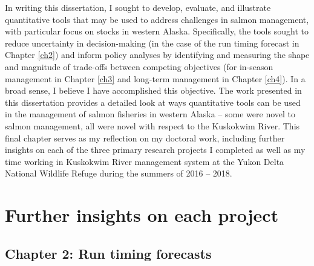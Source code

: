 \documentclass[12pt,]{book}
\theoremstyle{definition}
\theoremstyle{definition}
\theoremstyle{definition}
\theoremstyle{remark}
\begin{document}
\noindent
In writing this dissertation, I sought to develop, evaluate, and
illustrate quantitative tools that may be used to address challenges in
salmon management, with particular focus on stocks in western Alaska.
Specifically, the tools sought to reduce uncertainty in decision-making
(in the case of the run timing forecast in Chapter \ref{ch2}) and inform
policy analyses by identifying and measuring the shape and magnitude of
trade-offs between competing objectives (for in-season management in
Chapter \ref{ch3} and long-term management in Chapter \ref{ch4}). In a
broad sense, I believe I have accomplished this objective. The work
presented in this dissertation provides a detailed look at ways
quantitative tools can be used in the management of salmon fisheries in
western Alaska -- some were novel to salmon management, all were novel
with respect to the Kuskokwim River. This final chapter serves as my
reflection on my doctoral work, including further insights on each of
the three primary research projects I completed as well as my time
working in Kuskokwim River management system at the Yukon Delta National
Wildlife Refuge during the summers of 2016 -- 2018.

\section{Further insights on each
project}\label{further-insights-on-each-project}

\subsection{Chapter 2: Run timing
forecasts}\label{chapter-2-run-timing-forecasts}
\end{document}
